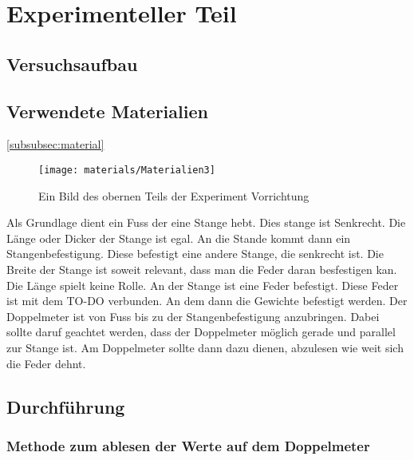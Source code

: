 \documentclass[../main.tex]{subfiles} %
\begin{document}
\section{Experimenteller Teil}\label{sec:experimenteller-teil}
    \subsection{Versuchsaufbau}\label{subsec:versuchsaufbau}

    \subsection{Verwendete Materialien}\ref{subsubsec:material}\label{zu der Materialliste}

        \begin{figure}[H]
            \centering
            \texttt{[image: materials/Materialien3]}
            \caption{Ein Bild des obernen Teils der Experiment Vorrichtung  \textcolor{blue}{\underline{}}}
            \label{fig:material10}
        \end{figure}

        Als Grundlage dient ein Fuss der eine Stange hebt. Dies stange ist Senkrecht.
        Die Länge oder Dicker der Stange ist egal. An die Stande kommt dann ein Stangenbefestigung.
        Diese befestigt eine andere Stange, die senkrecht ist.
        Die Breite der Stange ist soweit relevant, dass man die Feder daran besfestigen kan. Die Länge spielt keine Rolle.
        An der Stange ist eine Feder befestigt. Diese Feder ist mit dem TO-DO verbunden.
        An dem dann die Gewichte befestigt werden.
        Der Doppelmeter ist von Fuss bis zu der Stangenbefestigung anzubringen. Dabei sollte daruf geachtet werden, dass der Doppelmeter möglich gerade und parallel zur Stange ist.
        Am Doppelmeter sollte dann dazu dienen, abzulesen wie weit sich die Feder dehnt.

        \subsection{Durchführung}\label{subsec:durchfuhrung}

        \subsubsection{Methode zum ablesen der Werte auf dem Doppelmeter}\label{subsubsec:methode-zum-ablesen-der-werte-auf-dem-doppelmeter}
\end{document}
